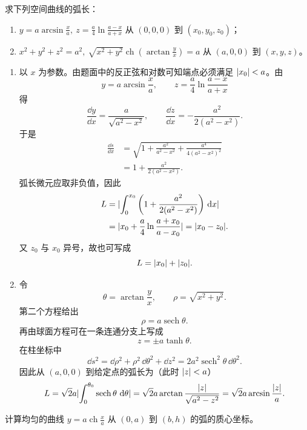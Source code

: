 \begin{xexercise}[2]
求下列空间曲线的弧长：
\begin{enumerate}[label=(\arabic*)]
  \item $y=a\arcsin\frac xa,\ z=\frac a4\ln\frac{a-x}{a+x}$ 从 $(0,0,0)$ 到 $(x_0,y_0,z_0)$；
  \item $x^2+y^2+z^2=a^2,\ \sqrt{x^2+y^2}\operatorname{ch}\left(\arctan\frac yx\right)=a$ 从 $(a,0,0)$ 到 $(x,y,z)$。
\end{enumerate}
\end{xexercise}
\begin{xsolution}
\begin{enumerate}[label=(\arabic*)]
\item 以 $x$ 为参数。由题面中的反正弦和对数可知端点必须满足 $\lvert x_0\rvert<a$。由
\[
  y=a\arcsin\frac xa,
  \qquad
  z=\frac a4\ln\frac{a-x}{a+x}
\]
得
\[
  \frac{\dd y}{\dd x}=\frac{a}{\sqrt{a^2-x^2}},
  \qquad
  \frac{\dd z}{\dd x}=-\frac{a^2}{2(a^2-x^2)}.
\]
于是
\begin{align*}
  \frac{\dd s}{\dd x}
  &=\sqrt{1+\frac{a^2}{a^2-x^2}
      +\frac{a^4}{4(a^2-x^2)^2}}\\
  &=1+\frac{a^2}{2(a^2-x^2)}.
\end{align*}
弧长微元应取非负值，因此
\begin{align*}
  L
  &=\lvert\int_0^{x_0}\left(1+\frac{a^2}{2(a^2-x^2)}\right)\,\mathop{}\!\mathrm{d} x\rvert\\
  &=\lvert x_0+\frac a4\ln\frac{a+x_0}{a-x_0}\rvert
   =\lvert x_0-z_0\rvert.
\end{align*}
又 $z_0$ 与 $x_0$ 异号，故也可写成
\[
  L=\lvert x_0\rvert+\lvert z_0\rvert.
\]

\item 令
\[
  \theta=\arctan\frac yx,
  \qquad \rho=\sqrt{x^2+y^2}.
\]
第二个方程给出
\[
  \rho=a\operatorname{sech}\theta.
\]
再由球面方程可在一条连通分支上写成
\[
  z=\pm a\tanh\theta.
\]
在柱坐标中
\[
  \dd s^2=\dd\rho^2+\rho^2\,\dd\theta^2+\dd z^2
  =2a^2\operatorname{sech}^2\theta\,\dd\theta^2.
\]
因此从 $(a,0,0)$ 到给定点的弧长为（此时 $\lvert z\rvert<a$）
\[
  L=\sqrt2a\lvert\int_0^{\theta_0}\operatorname{sech}\theta\,\mathop{}\!\mathrm{d}\theta\rvert
  =\sqrt2a\arctan\frac{\lvert z\rvert}{\sqrt{a^2-z^2}}
  =\sqrt2a\arcsin\frac{\lvert z\rvert}{a}.
\]
\end{enumerate}
\end{xsolution}
\begin{xexercise}[3]
计算均匀的曲线 $y=a\operatorname{ch}\frac xa$ 从 $(0,a)$ 到 $(b,h)$ 的弧的质心坐标。
\end{xexercise}
